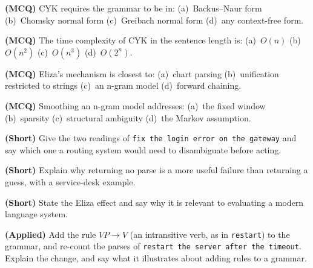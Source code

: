 \begin{reviewq}
  \item \textbf{(MCQ)} CYK requires the grammar to be in: (a)~Backus--Naur form
        (b)~Chomsky normal form (c)~Greibach normal form (d)~any context-free
        form.
  \item \textbf{(MCQ)} The time complexity of CYK in the sentence length is:
        (a)~$O(n)$ (b)~$O(n^{2})$ (c)~$O(n^{3})$ (d)~$O(2^{n})$.
  \item \textbf{(MCQ)} Eliza's mechanism is closest to: (a)~chart parsing
        (b)~unification restricted to strings (c)~an n-gram model (d)~forward
        chaining.
  \item \textbf{(MCQ)} Smoothing an n-gram model addresses: (a)~the fixed window
        (b)~sparsity (c)~structural ambiguity (d)~the Markov assumption.
  \item \textbf{(Short)} Give the two readings of \texttt{fix the login error on the
        gateway} and say which one a routing system would need to disambiguate
        before acting.
  \item \textbf{(Short)} Explain why returning no parse is a more useful failure
        than returning a guess, with a service-desk example.
  \item \textbf{(Short)} State the Eliza effect and say why it is relevant to
        evaluating a modern language system.
  \item \textbf{(Applied)} Add the rule $\mathit{VP} \to V$ (an intransitive verb,
        as in \texttt{restart}) to the grammar, and re-count the parses of
        \texttt{restart the server after the timeout}. Explain the change, and say
        what it illustrates about adding rules to a grammar.
\end{reviewq}

